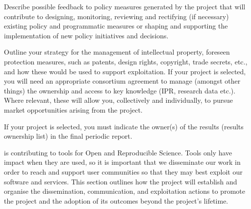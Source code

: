 \begin{draft}
Describe possible feedback to policy measures generated by the project that will
contribute to designing, monitoring, reviewing and rectifying (if necessary)
existing policy and programmatic measures or shaping and supporting the
implementation of new policy initiatives and decisions.
\begin{compactitem}
\item	Outline your strategy for the management of intellectual property, foreseen protection measures, such as patents, design rights, copyright, trade secrets, etc., and how these would be used to support exploitation.
	If your project is selected, you will need an appropriate consortium agreement
  to manage (amongst other things) the ownership and access to key knowledge
  (IPR, research data etc.). Where relevant, these will allow you, collectively
  and individually, to pursue market opportunities arising from the project.
\item If your project is selected, you must indicate the owner(s) of the results (results ownership list) in the final periodic report.
\end{compactitem}
\end{draft}


\TheProject is contributing to tools for Open and Reproducible Science.
Tools only have impact when they are used,
so it is important that we disseminate our work
in order to reach and support user communities so that they may best exploit our software and services. This section
outlines how the project will establish and organise the dissemination, communication, and exploitation
actions to promote the project and the adoption of its outcomes beyond the project's lifetime.



